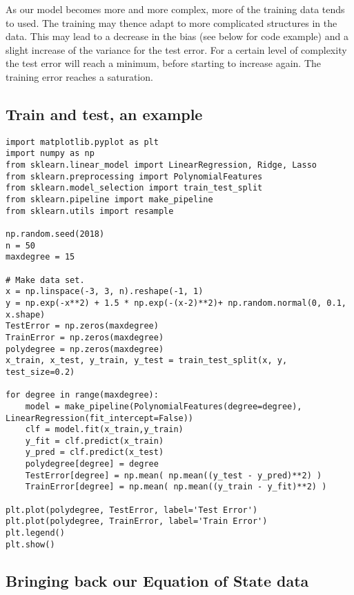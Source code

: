 \documentclass[%
oneside,                 %
final,                   %
10pt]{article}
\begin{document}
\noindent
As our model becomes more and more complex, more of the training data
tends to used. The training may thence adapt to more complicated
structures in the data. This may lead to a decrease in the bias (see
below for code example) and a slight increase of the variance for the
test error.  For a certain level of complexity the test error will
reach a minimum, before starting to increase again. The training error
reaches a saturation.

\subsection*{Train and test,  an example}
\begin{verbatim}
import matplotlib.pyplot as plt
import numpy as np
from sklearn.linear_model import LinearRegression, Ridge, Lasso
from sklearn.preprocessing import PolynomialFeatures
from sklearn.model_selection import train_test_split
from sklearn.pipeline import make_pipeline
from sklearn.utils import resample

np.random.seed(2018)
n = 50
maxdegree = 15

# Make data set.
x = np.linspace(-3, 3, n).reshape(-1, 1)
y = np.exp(-x**2) + 1.5 * np.exp(-(x-2)**2)+ np.random.normal(0, 0.1, x.shape)
TestError = np.zeros(maxdegree)
TrainError = np.zeros(maxdegree)
polydegree = np.zeros(maxdegree)
x_train, x_test, y_train, y_test = train_test_split(x, y, test_size=0.2)

for degree in range(maxdegree):
    model = make_pipeline(PolynomialFeatures(degree=degree), LinearRegression(fit_intercept=False))
    clf = model.fit(x_train,y_train)
    y_fit = clf.predict(x_train)
    y_pred = clf.predict(x_test) 
    polydegree[degree] = degree
    TestError[degree] = np.mean( np.mean((y_test - y_pred)**2) )
    TrainError[degree] = np.mean( np.mean((y_train - y_fit)**2) )

plt.plot(polydegree, TestError, label='Test Error')
plt.plot(polydegree, TrainError, label='Train Error')
plt.legend()
plt.show()
\end{verbatim}

\subsection*{Bringing back our Equation of State data}
\end{document}
